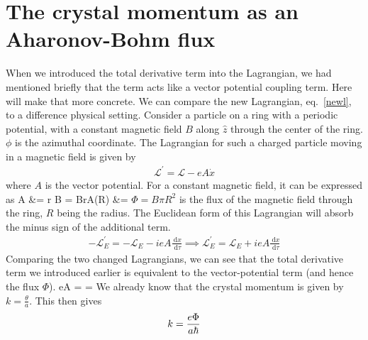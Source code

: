 \documentclass{article}
\begin{document}
\section{The crystal momentum as an Aharonov-Bohm flux}
When we introduced the total derivative term into the Lagrangian, we had mentioned briefly that the term acts like a vector potential coupling term. Here will make that more concrete. We can compare the new Lagrangian, eq.~\ref{newl}, to a difference physical setting. Consider a particle on a ring with a periodic potential, with a constant magnetic field \(B\) along \(\hat z\) through the center of the ring. \(\phi\) is the azimuthal coordinate. The Lagrangian for such a charged particle moving in a magnetic field is given by
\begin{equation}\begin{aligned}
	\mathcal{L}^\prime = \mathcal{L} - eA \dot x
\end{aligned}\end{equation}
where \(A\) is the vector potential. For a constant magnetic field, it can be expressed as
\beq
\vec A &= \vec r \times \vec B = Br\hat \phi \implies A(R) &= 
\eeq
\(\Phi = B\pi R^2\) is the flux of the magnetic field through the ring, \(R\) being the radius. 
The Euclidean form of this Lagrangian will absorb the minus sign of the additional term.
\begin{equation}\begin{aligned}
	-\mathcal{L}_E^\prime = -\mathcal{L}_E - ieA \frac{\:\mathrm{d}x}{\:\mathrm{d}\tau} \implies \mathcal{L}_E^\prime = \mathcal{L}_E + ieA \frac{\:\mathrm{d}x}{\:\mathrm{d}\tau}
\end{aligned}\end{equation}
Comparing the two changed Lagrangians, we can see that the total derivative term we introduced earlier is equivalent to the vector-potential term (and hence the flux \(\Phi\)).
\beq[sakura]
eA =  \implies \theta = 
\eeq
We already know that the crystal momentum is given by \(k = \frac{\theta}{a}\). This then gives
\begin{equation}\begin{aligned}
k = \frac{e\Phi}{a\hbar}
\end{aligned}\end{equation}
\end{document}
